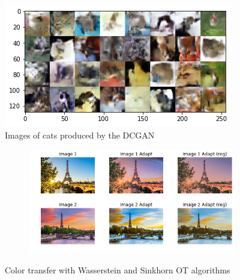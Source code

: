 \documentclass[11pt,conference,compsoc]{IEEEtran}
\begin{document}
\begin{figure}[]
    \centering
    \includegraphics[width=0.8\linewidth]{images/dcgan_cats_30k_128.png}
    \caption{Images of cats produced by the DCGAN}
    \label{fig:16}
\end{figure}

\begin{figure}[]
    \centering
    \begin{subfigure}{0.50\linewidth}
        \includegraphics[width=\linewidth]{images/ot.png}
    \end{subfigure}	        
    \caption{Color transfer with Wasserstein and Sinkhorn  OT algorithms}
    \label{fig:17}
\end{figure}
\end{document}
